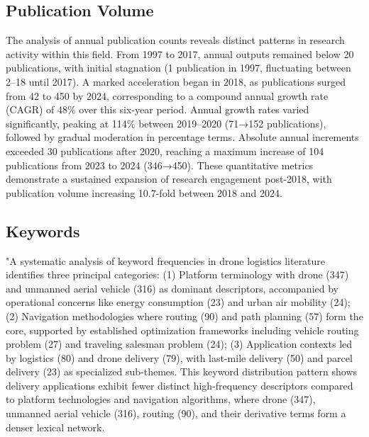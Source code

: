 \documentclass{article}
\begin{document}
\subsection{Publication Volume}
 The analysis of annual publication counts reveals distinct patterns in research activity within this field. From 1997 to 2017, annual outputs remained below 20 publications, with initial stagnation (1 publication in 1997, fluctuating between 2–18 until 2017). A marked acceleration began in 2018, as publications surged from 42 to 450 by 2024, corresponding to a compound annual growth rate (CAGR) of 48\% over this six-year period. Annual growth rates varied significantly, peaking at 114\% between 2019–2020 (71→152 publications), followed by gradual moderation in percentage terms. Absolute annual increments exceeded 30 publications after 2020, reaching a maximum increase of 104 publications from 2023 to 2024 (346→450). These quantitative metrics demonstrate a sustained expansion of research engagement post-2018, with publication volume increasing 10.7-fold between 2018 and 2024.

\subsection{Keywords}
"A systematic analysis of keyword frequencies in drone logistics literature identifies three principal categories: (1) Platform terminology with drone (347) and unmanned aerial vehicle (316) as dominant descriptors, accompanied by operational concerns like energy consumption (23) and urban air mobility (24); (2) Navigation methodologies where routing (90) and path planning (57) form the core, supported by established optimization frameworks including vehicle routing problem (27) and traveling salesman problem (24); (3) Application contexts led by logistics (80) and drone delivery (79), with last-mile delivery (50) and parcel delivery (23) as specialized sub-themes. This keyword distribution pattern shows delivery applications exhibit fewer distinct high-frequency descriptors compared to platform technologies and navigation algorithms, where drone (347), unmanned aerial vehicle (316), routing (90), and their derivative terms form a denser lexical network.
\end{document}
